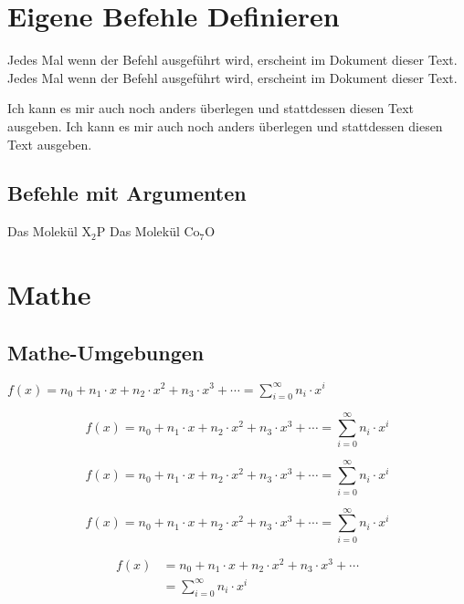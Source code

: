 \documentclass[fleqn]%
{scrartcl}
\begin{document}
\section{Eigene Befehle Definieren}

\newcommand{\meinersterbefehl}{Jedes Mal wenn der Befehl ausgeführt wird, erscheint im Dokument dieser Text.}

\meinersterbefehl
\meinersterbefehl

\renewcommand{\meinersterbefehl}{Ich kann es mir auch noch anders überlegen und stattdessen diesen Text ausgeben.}

\meinersterbefehl
\meinersterbefehl

\subsection{Befehle mit Argumenten}

\newcommand{\molekuel}[3][X]{Das Molekül #1$_{#2}$#3}

\molekuel{2}{P}
\molekuel[Co]{7}{O}





\section{Mathe}
\subsection{Mathe-Umgebungen}

$ f(x) = n_0 + n_1 \cdot x + n_2 \cdot x^2 + n_3 \cdot x^3 + \cdots = \sum_{i=0}^\infty n_i \cdot x^i $

\[
	f(x) = n_0 + n_1 \cdot x + n_2 \cdot x^2 + n_3 \cdot x^3 + \cdots = \sum_{i=0}^\infty n_i \cdot x^i
\]

\begin{displaymath}
	f(x) = n_0 + n_1 \cdot x + n_2 \cdot x^2 + n_3 \cdot x^3 + \cdots = \sum_{i=0}^\infty n_i \cdot x^i
\end{displaymath}

\begin{equation}
	f(x) = n_0 + n_1 \cdot x + n_2 \cdot x^2 + n_3 \cdot x^3 + \cdots = \sum_{i=0}^\infty n_i \cdot x^i
\end{equation}

\begin{align}
	f(x) &= n_0 + n_1 \cdot x + n_2 \cdot x^2 + n_3 \cdot x^3 + \cdots \\
	     &= \sum_{i=0}^\infty n_i \cdot x^i
\end{align}
\end{document}
